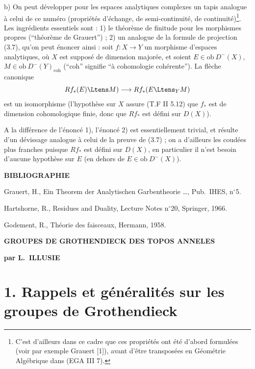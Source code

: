 b) On peut d\'{e}velopper pour les espaces analytiques complexes un tapis analogue \`{a} celui de ce num\'{e}ro (propri\'{e}t\'{e}s d'\'{e}change, de semi-continuit\'{e}, de continuit\'{e})\footnote{C'est d'ailleurs dans ce cadre que ces propri\'{e}t\'{e}s ont \'{e}t\'{e} d'abord formul\'{e}es (voir par exemple Grauert [1]), avant d'\^{e}tre transpos\'{e}es en G\'{e}om\'{e}trie Alg\'{e}brique dans (EGA III 7).}. Les ingr\'{e}dients essentiels sont : 1) le th\'{e}or\`{e}me de finitude pour les morphismes propres (``th\'{e}or\`{e}me de Grauert'') ; 2) un analogue de la formule de projection (3.7), qu'on peut \'{e}noncer ainsi : soit $f : X \longrightarrow Y$ un morphisme d'espaces analytiques, o\`{u} $X$ est suppos\'{e} de dimension major\'{e}e, et soient $E \in \mathrm{ob}\ D^-(X)$, $M \in \mathrm{ob}\ D^-(Y)_{\mathrm{coh}}$ (``coh'' signifie ``\`{a} cohomologie coh\'{e}rente''). La fl\`{e}che canonique
\[
Rf_*(E) \Ltens M) \longrightarrow Rf_*(E \Ltens_Y M)
\]
est un isomorphisme (l'hypoth\`{e}se sur $X$ assure (T.F II 5.12) que $f_*$ est de dimension cohomologique finie, donc que $Rf_*$ est d\'{e}fini sur $D(X)$).

A la diff\'{e}rence de l'\'{e}nonc\'{e} 1), l'\'{e}nonc\'{e} 2) est essentiellement trivial, et r\'{e}sulte d'un d\'{e}vissage analogue \`{a} celui de la preuve de (3.7) ; on a d'ailleurs les coud\'{e}es plus franches puisque $Rf_*$ est d\'{e}fini sur $D(X)$, en particulier il n'est besoin d'aucune hypoth\`{e}se sur $E$ (en dehors de $E \in \mathrm{ob}\ D^-(X)$).

\medskip

\noindent\textbf{BIBLIOGRAPHIE}

\medskip

\noindent [1] \quad Grauert, H., Ein Theorem der Analytischen Garbentheorie \ldots, Pub.\ IHES, n$^{\circ}$5.

\medskip

\noindent [H] \quad Hartshorne, R., Residues and Duality, Lecture Notes n$^{\circ}$20, Springer, 1966.

\medskip

\noindent [T.F] Godement, R., Th\'{e}orie des faisceaux, Hermann, 1958.

\newpage
\begin{center}
\textbf{\Large GROUPES DE GROTHENDIECK DES TOPOS ANNELES}

\medskip

\textbf{par L.\ ILLUSIE}
\end{center}

\section*{1. Rappels et g\'{e}n\'{e}ralit\'{e}s sur les groupes de Grothendieck}

